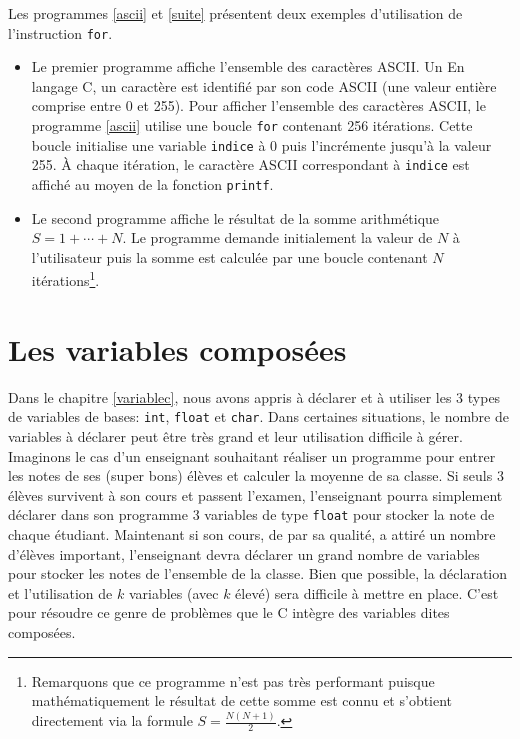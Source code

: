 \documentclass[a4paper,11pt]{book}
\theoremstyle{definition}
\begin{document}
Les programmes \ref{ascii} et \ref{suite} présentent deux exemples d'utilisation de l'instruction \texttt{for}.
\begin{itemize}
\item Le premier programme affiche l'ensemble des caractères ASCII. Un En langage C, un caractère est identifié par son code ASCII (une valeur entière comprise entre 0 et 255). Pour afficher l'ensemble des caractères ASCII, le programme \ref{ascii} utilise une boucle \texttt{for} contenant 256 itérations. Cette boucle initialise une variable \texttt{indice} à 0 puis l'incrémente jusqu'à la valeur 255. \`A chaque itération, le caractère ASCII correspondant à \texttt{indice} est affiché au moyen de la fonction \texttt{printf}.

\item Le second programme affiche le résultat de la somme arithmétique $S=1+\cdots+N$. Le programme demande initialement la valeur de $N$ à l'utilisateur puis la somme est calculée par une boucle contenant $N$ itérations\footnote{Remarquons que ce programme n'est pas très performant puisque mathématiquement le résultat de cette somme est connu et s'obtient directement via la formule $S=\frac{N(N+1)}{2}$.}.
\end{itemize}






\chapter{Les variables composées}

Dans le chapitre \ref{variablec}, nous avons appris à déclarer et à utiliser les 3 types de variables de bases: \texttt{int}, \texttt{float} et \texttt{char}. Dans certaines situations, le nombre de variables à déclarer peut être très grand et leur utilisation difficile à gérer. Imaginons le cas d'un enseignant souhaitant réaliser un programme pour entrer les notes de ses (super bons) élèves et calculer la moyenne de sa classe. Si seuls 3 élèves survivent à son cours et passent l'examen, l'enseignant pourra simplement déclarer dans son programme 3 variables de type \texttt{float} pour stocker la note de chaque étudiant. Maintenant si son cours, de par sa qualité, a attiré un nombre d'élèves important, l'enseignant devra déclarer un grand nombre de variables pour stocker les notes de l'ensemble de la classe. Bien que possible, la déclaration et l'utilisation de $k$ variables (avec $k$ élevé) sera difficile à mettre en place. C'est pour résoudre ce genre de problèmes que le C intègre des variables dites composées.\\
\end{document}
